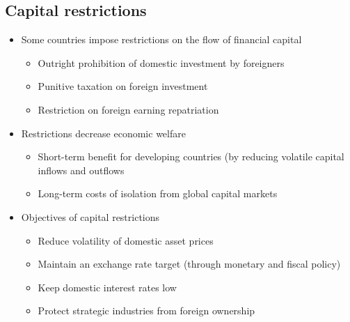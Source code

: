 \documentclass[../notes_compiled.tex]{subfiles}
\begin{document}
\subsection{Capital restrictions}
\begin{itemize}
\item Some countries impose restrictions on the flow of financial capital
\begin{itemize}
\item Outright prohibition of domestic investment by foreigners
\item Punitive taxation on foreign investment
\item Restriction on foreign earning repatriation
\end{itemize}
\item Restrictions decrease economic welfare
\begin{itemize}
\item Short-term benefit for developing countries (by reducing volatile capital inflows and outflows
\item Long-term costs of isolation from global capital markets
\end{itemize}
\item Objectives of capital restrictions
\begin{itemize}
\item Reduce volatility of domestic asset prices
\item Maintain an exchange rate target (through monetary and fiscal policy)
\item Keep domestic interest rates low
\item Protect strategic industries from foreign ownership
\end{itemize}
\end{itemize}
\end{document}
